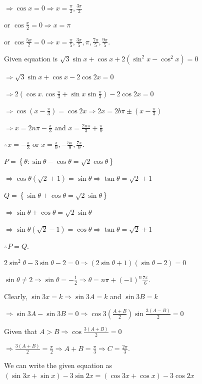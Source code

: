   $\Rightarrow \cos x = 0 \Rightarrow x = \frac{\pi}{2}, \frac{3\pi}{2}$

  or $\cos\frac{x}{2} = 0 \Rightarrow x = \pi$

  or $\cos\frac{5x}{2} = 0 \Rightarrow x
  = \frac{\pi}{5}, \frac{3\pi}{5}, \pi, \frac{7\pi}{5}, \frac{9\pi}{5}$.
\item Given equation is $\sqrt{3}\sin x + \cos x + 2(\sin^2x - \cos^2x) = 0$

  $\Rightarrow \sqrt{3}\sin x + \cos x - 2\cos2x = 0$

  $\Rightarrow 2\left(\cos x.\cos\frac{\pi}{3} + \sin x\sin\frac{\pi}{3}\right) - 2\cos2x = 0$

  $\Rightarrow \cos\left(x - \frac{\pi}{3}\right) = \cos 2x\Rightarrow 2x = 2b\pi\pm\left(x
  - \frac{\pi}{3}\right)$

  $\Rightarrow x = 2n\pi - \frac{\pi}{3}$ and $x = \frac{2n\pi}{3} + \frac{\pi}{9}$

  $\therefore x = -\frac{\pi}{3}$ or $x = \frac{\pi}{9}, -\frac{5\pi}{9}, \frac{7\pi}{9}$.
\item $P = \left\{\theta: \sin\theta - \cos\theta = \sqrt{2}\cos\theta\right\}$

  $\Rightarrow \cos\theta(\sqrt{2} + 1) = \sin\theta \Rightarrow \tan\theta = \sqrt{2} + 1$

  $Q = \left\{\sin\theta + \cos\theta = \sqrt{2}\sin\theta\right\}$

  $\Rightarrow \sin\theta + \cos\theta = \sqrt{2}\sin\theta$

  $\Rightarrow \sin\theta(\sqrt{2} - 1) = \cos\theta \Rightarrow \tan\theta = \sqrt{2} + 1$

  $\therefore P = Q$.
\item $2\sin^2\theta - 3\sin\theta - 2 = 0\Rightarrow (2\sin\theta + 1)(\sin\theta - 2) = 0$

  $\sin\theta\ne 2\Rightarrow \sin\theta = -\frac{1}{2}\Rightarrow \theta = n\pi + (-1)^n\frac{7\pi}{6}$.
\item Clearly, $\sin3x = k \Rightarrow \sin 3A = k$ and $\sin3B = k$

  $\Rightarrow \sin3A - \sin3B = 0 \Rightarrow \cos3\left(\frac{A + B}{2}\right)\sin\frac{3(A - B)}{2} = 0$

  Given that $A > B\Rightarrow \cos\frac{3(A + B)}{2} = 0$

  $\Rightarrow \frac{3(A + B)}{2} = \frac{\pi}{2}\Rightarrow A + B = \frac{\pi}{3}\Rightarrow C
  = \frac{2\pi}{3}$.
\item We can write the given equation as $(\sin 3x + \sin x) - 3\sin2x = (\cos3x + \cos x) - 3\cos2x$

